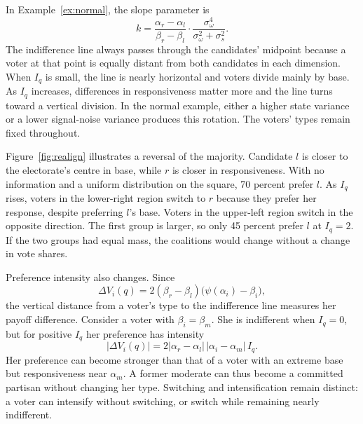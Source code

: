 \documentclass[12pt,letterpaper]{article}
\begin{document}
In Example~\ref{ex:normal}, the slope parameter is
\[
k=\frac{\alpha_r-\alpha_l}{\beta_r-\beta_l}\cdot\frac{\sigma_\omega^4}{\sigma_\omega^2+\sigma_s^2}.
\]
The indifference line always passes through the candidates' midpoint because a voter at that point is equally distant from both candidates in each dimension. When $I_q$ is small, the line is nearly horizontal and voters divide mainly by base. As $I_q$ increases, differences in responsiveness matter more and the line turns toward a vertical division. In the normal example, either a higher state variance or a lower signal-noise variance produces this rotation. The voters' types remain fixed throughout.

Figure~\ref{fig:realign} illustrates a reversal of the majority. Candidate $l$ is closer to the electorate's centre in base, while $r$ is closer in responsiveness. With no information and a uniform distribution on the square, 70 percent prefer $l$. As $I_q$ rises, voters in the lower-right region switch to $r$ because they prefer her response, despite preferring $l$'s base. Voters in the upper-left region switch in the opposite direction. The first group is larger, so only 45 percent prefer $l$ at $I_q=2$. If the two groups had equal mass, the coalitions would change without a change in vote shares.

Preference intensity also changes. Since
\[
\Delta V_i(q)=2(\beta_r-\beta_l)\big(\psi(\alpha_i)-\beta_i\big),
\]
the vertical distance from a voter's type to the indifference line measures her payoff difference. Consider a voter with $\beta_i=\beta_m$. She is indifferent when $I_q=0$, but for positive $I_q$ her preference has intensity
\[
|\Delta V_i(q)|=2|\alpha_r-\alpha_l|\,|\alpha_i-\alpha_m|\,I_q.
\]
Her preference can become stronger than that of a voter with an extreme base but responsiveness near $\alpha_m$. A former moderate can thus become a committed partisan without changing her type. Switching and intensification remain distinct: a voter can intensify without switching, or switch while remaining nearly indifferent.
\end{document}
